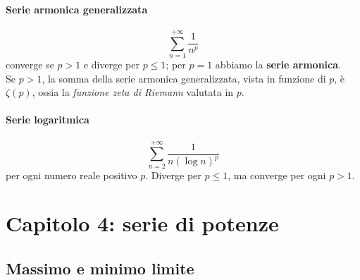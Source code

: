 \paragraph{Serie armonica generalizzata}
	\begin{equation}
		\sum_{n=1}^{+\infty}\frac{1}{n^p}
	\end{equation}
	converge se $p>1$ e diverge per $p\leq 1$; per $p=1$ abbiamo la \textbf{serie armonica}.\\
	Se $p>1$, la somma della serie armonica generalizzata, vista in funzione di $p$, è $\zeta\left(p\right)$, ossia la \textit{funzione zeta di Riemann} valutata in $p$.
\paragraph{Serie logaritmica}
	\begin{equation}
		\sum_{n=2}^{+\infty}\frac{1}{n\left(\log n\right)^p}
	\end{equation}
	per ogni numero reale positivo $p$. Diverge per $p\leq 1$, ma converge per ogni $p>1$.
\section{Capitolo 4: serie di potenze}
\subsection{Massimo e minimo limite}\label{maxminlimite}
